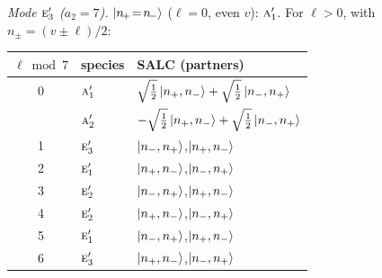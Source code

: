 \documentclass[11pt]{article}
\newcommand{\irr}[1]{\text{\normalfont\scshape #1}}
\begin{document}
\emph{Mode $\irr{e}_{3}'$ ($a_2=7$).} $\ket{n_{\!+}\!=\!n_{\!-}}$ ($\ell=0$, even $v$): $\irr{a}_{1}'$. For $\ell>0$, with $n_\pm=(v\pm\ell)/2$:
\begin{longtable}{c l l}\hline $\ell\bmod 7$ & species & SALC (partners)\\ \hline\endhead
0 & $\irr{a}_{1}'$ & $\sqrt{\tfrac{1}{2}}\ket{n_+,n_-}+\sqrt{\tfrac{1}{2}}\ket{n_-,n_+}$\\
 & $\irr{a}_{2}'$ & $-\sqrt{\tfrac{1}{2}}\ket{n_+,n_-}+\sqrt{\tfrac{1}{2}}\ket{n_-,n_+}$\\
1 & $\irr{e}_{3}'$ & $\ket{n_-,n_+}$,\quad $\ket{n_+,n_-}$\\
2 & $\irr{e}_{1}'$ & $\ket{n_+,n_-}$,\quad $\ket{n_-,n_+}$\\
3 & $\irr{e}_{2}'$ & $\ket{n_-,n_+}$,\quad $\ket{n_+,n_-}$\\
4 & $\irr{e}_{2}'$ & $\ket{n_+,n_-}$,\quad $\ket{n_-,n_+}$\\
5 & $\irr{e}_{1}'$ & $\ket{n_-,n_+}$,\quad $\ket{n_+,n_-}$\\
6 & $\irr{e}_{3}'$ & $\ket{n_+,n_-}$,\quad $\ket{n_-,n_+}$\\
\hline\end{longtable}
\end{document}
